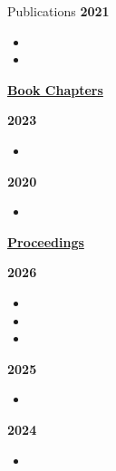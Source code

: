 \documentclass{resume} %
\begin{document}
\begin{rSection}{Publications}
{\bf\large 2021}
\begin{itemize}
  
  \item {} %
  \item {} %
\end{itemize}



\bigskip
\underline{{\bf\Large Book Chapters}}


{\bf\large 2023}

\begin{itemize}
      \item {} %
\end{itemize}
{\bf\large 2020}

\begin{itemize}
  \item {}%
 \end{itemize}

\bigskip
\underline{{\bf\Large Proceedings}}

{\bf\large 2026}
\begin{itemize}

\item {}

\item {}%

\item {}%

\end{itemize}


{\bf\large 2025}
\begin{itemize}

\item {}%

\end{itemize}

{\bf\large 2024}
\begin{itemize}
    \item {}%


\end{itemize}
\end{rSection}
\end{document}
